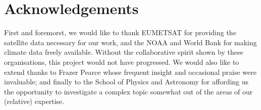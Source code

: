 \section*{Acknowledgements}


First and foremorst, we would like to thank EUMETSAT for providing the
satellite data necessary for our work, and the NOAA and World Bank for
making climate data freely available. Without the collaborative spirit
shown by these organisations, this project would not have
progressed. We would also like to extend thanks to Frazer Pearce whose
frequent insight and occasional praise were invaluable; and finally to
the School of Physics and Astronomy for affording us the opportunity
to investigate a complex topic somewhat out of the areas of our
(relative) expertise.


